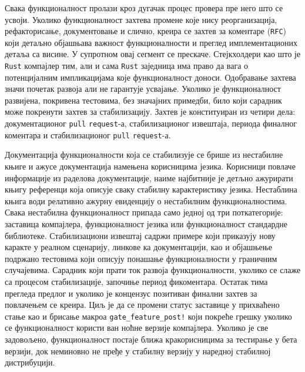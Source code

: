 Свака функционалност пролази кроз дугачак процес провера пре него 
што се усвоји. Уколико функционалност захтева промене које нису реорганизација, рефакторисање, документовање
и слично, креира се захтев за коментаре (\verb|RFC|) који детаљно објашњава важност функционалности и 
преглед имплементационих детаља са висине. У супротном овај сегмент се прескаче. Стејкхолдери као што је \verb|Rust| компајлер тим, али и сама \verb|Rust| заједница 
има право да вага о потенцијалним импликацијама које функционалност доноси. Одобравање захтева значи почетак 
развоја али не гарантује усвајање. Уколико је функционалност развијена, покривена тестовима, 
без значајних примедби, било који сарадник може покренути захтев за стабилизацију. Захтев је конституиран из 
четири дела: документационог \verb|pull| \verb|request|-а, стабилизационог извештаја, 
периода финалног коментара и стабилизационог \verb|pull| \verb|request|-а.

Документација функционалности која се стабилизује се брише из нестабилне књиге \cite{unstable} и ажу се 
документација намењена корисницима језика. Корисници повлаче информације из ра делова документације,
наиме најбитније је детљно ажурирати књигу референци \cite{rust-reference} која описује сваку стабилну 
карактеристику језика. Нестаблина књига води релативно ажурну евиденцију о нестабилним функционалностима.
Свака нестабилна функционалност припада само једној од три поткатегорије: заставица компајлера, функционалност језика или
функционалност стандардне библиотеке. Стабилизациони извештај садржи примере који приказују нову каракте 
у реалном сценарију, линкове ка документацији, као и објашњење подржано тестовима који описују понашање функционалности у 
граничним случајевима. Сарадник који прати ток развоја функционалности, уколико се слаже са процесом 
стабилизације, започиње период фи коментара. Остатак тима прегледа предлог и уколико је концензус
позитиван финални захтев за повлачењем се креира. Циљ је да се промени статус заставице у прихваћено
стање као и брисање макроа \verb|gate_feature_post!| који покреће грешку уколико се функционалност користи ван ноћне верзије компајлера.
Уколико је све задовољено, функционалност постаје ближа кра корисницима за тестирање у бета верзији, док
неминовно не пређе у стабилну верзију у наредној стабилној дистрибуцији. 

